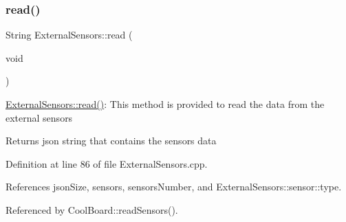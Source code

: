 \mbox{\label{classExternalSensors_a53177b81eca3be89508b5511ddcd00fc}} 
\subsubsection{\texorpdfstring{read()}{read()}}
{\footnotesize\ttfamily String External\+Sensors\+::read (\begin{DoxyParamCaption}\item[{void}]{ }\end{DoxyParamCaption})}

\hyperlink{classExternalSensors_a53177b81eca3be89508b5511ddcd00fc}{External\+Sensors\+::read()}\+: This method is provided to read the data from the external sensors

\begin{DoxyReturn}{Returns}
json string that contains the sensors data 
\end{DoxyReturn}


Definition at line 86 of file External\+Sensors.\+cpp.



References json\+Size, sensors, sensors\+Number, and External\+Sensors\+::sensor\+::type.



Referenced by Cool\+Board\+::read\+Sensors().


